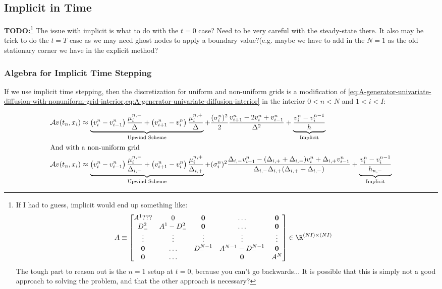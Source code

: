 \documentclass[11pt]{etk-article}
\begin{document}
\subsection{Implicit in Time}
\textbf{TODO:}\footnote{If I had to guess, implicit would end up something like:
\begin{align}
A &\equiv \begin{bmatrix}
A^1 ???	& 0		& \mathbf{0}			 & \ldots 			& \mathbf{0}\\
D_{-}^2 		&A^1 - D_{-}^2 & \mathbf{0}				 & \ldots			 & \mathbf{0}\\	
\vdots 			& \vdots 		& \vdots				& \vdots			&\vdots\\
\mathbf{0} 		&\ldots 	 	& D_{-}^{N-1}			& A^{N-1} - D_{-}^{N-1} &\mathbf{0}	\\
\mathbf{0} 		&\ldots 		&						& \mathbf{0}	&A^N
\end{bmatrix}\in\R^{(N I)\times (N I)}
\end{align}
The tough part to reason out is the $n=1$ setup at $t=0$, because you can't go backwards...  It is possible that this is simply not a good approach to solving the problem, and that the other approach is necessary?}
The issue with implicit is what to do with the $t=0$ case?  Need to be very careful with the steady-state there.  It also may be trick to do the $t=T$ case as we may need ghost nodes to apply a boundary value?(e.g. maybe we have to add in the $N=1$ as the old stationary corner we have in the explicit method?\\
\subsubsection{Algebra for Implicit Time Stepping}
If we use implicit time stepping, then the discretization for uniform and non-uniform grids is a modification of  \cref{eq:A-generator-univariate-diffusion-with-nonuniform-grid-interior,eq:A-generator-univariate-diffusion-interior} in the interior $0 < n < N$ and $1 < i < I$:

\begin{align}
\mathcal{A} v(t_n, x_i) &\approx \underbrace{\left(v^n_i-v^n_{i-1}\right)\frac{\mu_i^{n,-}}{\Delta}+ \left(v^n_{i+1}-v^n_i\right)\frac{\mu_i^{n,+}}{\Delta}}_{\text{Upwind Scheme}}  + \frac{(\sigma^n_i)^2}{2} \frac{v^n_{i+1} - 2 v^n_i + v^n_{i-1}}{\Delta^2} + \underbrace{\frac{v^{n}_i - v^{n-1}_i}{h}}_{\text{Implicit}} \label{eq:A-generator-univariate-diffusion-interior-implicit-t}\\
\intertext{And with a non-uniform grid}
\mathcal{A} v(t_n, x_i) &\approx \underbrace{\left(v^n_i-v^n_{i-1}\right)\frac{\mu_i^{n, -}}{\Delta_{i,-}}+ \left(v^n_{i+1}-v^n_i\right)\frac{\mu_i^{n, +}}{\Delta_{i,+}}}_{\text{Upwind Scheme}}  + (\sigma^n_i)^2 \frac{\Delta_{i,-}v^n_{i+1} - (\Delta_{i,+}+\Delta_{i,-}) v^n_i + \Delta_{i,+}v^n_{i-1}}{\Delta_{i,-}\Delta_{i,+}(\Delta_{i,+}+\Delta_{i,-})}+ \underbrace{\frac{v^{n}_i - v^{n-1}_i}{h_{n,-}}}_{\text{Implicit}}\label{eq:A-generator-univariate-diffusion-with-nonuniform-grid-interior-implicit-t}
\end{align}
\end{document}
